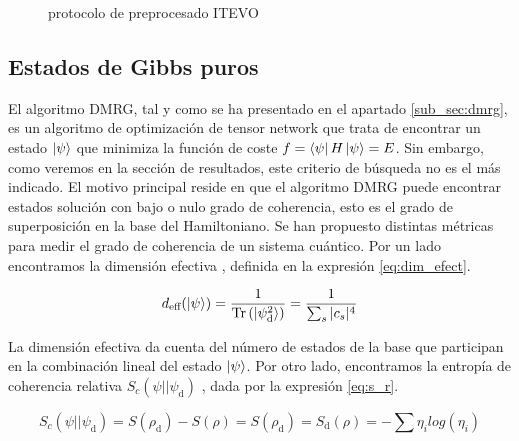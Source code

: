 \begin{figure}[htb]

\caption{protocolo de preprocesado ITEVO}
\label{fig:i_tevo_qaoa}
\end{figure}

\subsection{Estados de Gibbs puros}

El algoritmo DMRG, tal y como se ha presentado en el apartado \ref{sub_sec:dmrg}, es un algoritmo de optimización de tensor network que trata de encontrar un estado $\ket{\psi}$ que minimiza la función de coste $f = \bra{\psi}H\ket{\psi} = E$. Sin embargo, como veremos en la sección de resultados, este criterio de búsqueda no es el más indicado. El motivo principal reside en que el algoritmo DMRG puede encontrar estados solución con bajo o nulo grado de coherencia, esto es el grado de superposición en la base del Hamiltoniano. Se han propuesto distintas métricas para medir el grado de coherencia de un sistema cuántico. Por un lado encontramos la dimensión efectiva \citep{mori},  definida en la expresión \ref{eq:dim_efect}. 

\begin{equation}
    d_\textrm{eff}(\ket{\psi}) = \frac{1}{\textrm{Tr}\left(\ket{\psi_\textrm{d}^2}\right)}=\frac{1}{\sum_{s}|c_s|^4}
    \label{eq:dim_efect}
\end{equation}

\newpage

La dimensión efectiva da cuenta del número de estados de la base que participan en la combinación lineal del estado $\ket{\psi}$. Por otro lado, encontramos la entropía de coherencia relativa $S_{c}(\psi||\psi_\textrm{d})$ \citep{xi}, dada por la expresión \ref{eq:s_r}.

\begin{equation}
    S_{c}(\psi||\psi_\textrm{d})=S(\rho_\textrm{d})-S(\rho) = S(\rho_\textrm{d})=S_\textrm{d}(\rho) = - \sum \eta_{i} log(\eta_{i})
    \label{eq:s_r}
\end{equation}

